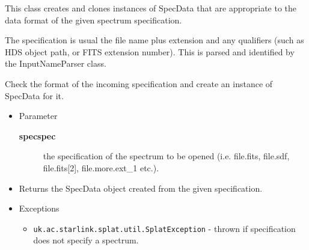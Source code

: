 \vspace{.09in}


{This class creates and clones instances of SpecData that are
 appropriate to the data format of the given spectrum specification.
 
 The specification is usual the file name plus extension and any
 qualifiers (such as HDS object path, or FITS extension
 number). This is parsed and identified by the InputNameParser
 class.}
\methods
{}
\begin{desc}Check the format of the incoming specification and create an
  instance of SpecData for it.
\begin{itemize}
\item{Parameter
  \begin{description}
   \item[\textbf{specspec}]{the specification of the spectrum to be
                  opened (i.e. file.fits, file.sdf,
                  file.fits[2], file.more.ext\_1 etc.).}
  \end{description}}
\end{itemize}
\begin{itemize}
\item{Returns the SpecData object created from the given
          specification. }
\item{{Exceptions}
  \begin{itemize}
   \item{\vspace{-.6ex}\texttt{uk.ac.starlink.splat.util.SplatException} - thrown if specification does not
             specify a spectrum.}
  \end{itemize}
}
\end{itemize}
\end{desc}


